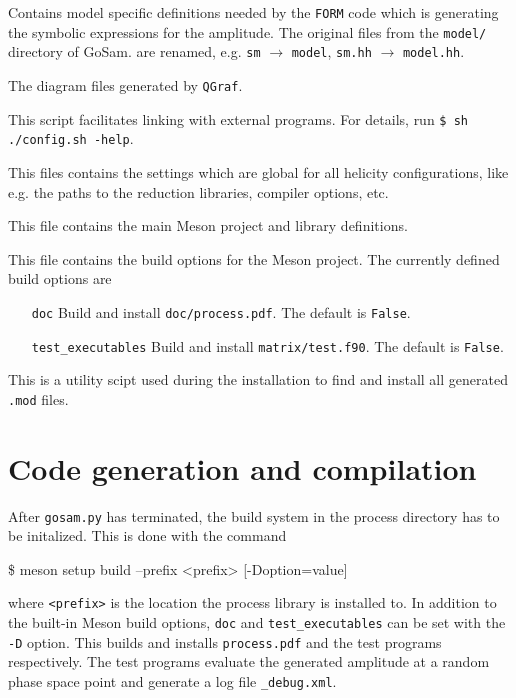 \documentclass[11pt,a4paper]{refrep}
\newcommand{\gosamversion}{{3{.}0}}
\newcommand{\gosamv}[1][\gosamversion]{{\sc GoSam}\xspace}
\newcommand{\qgraf}{{\tt QGraf}\xspace}
\newcommand{\form}{{\tt FORM}\xspace}
\begin{document}
Contains model specific definitions needed by the \form code
which is generating the symbolic expressions for the amplitude.
The original files from the \texttt{model/} directory of \gosamv. 
are renamed, e.g.
\texttt{sm} $\to$ \texttt{model}, \texttt{sm.hh} $\to$ \texttt{model.hh}.

 The diagram files generated
by \qgraf.

 This script facilitates linking with external
programs. For details, run
{\tt \$ sh ./config.sh -help}.

 This files contains the settings
which are global for all helicity configurations, 
like e.g. the paths to the reduction libraries, compiler options, etc.

 This file contains the main Meson project and library definitions.

 This file contains the build options for the Meson project. The currently
defined build options are 
\begin{itemize}
   \item[{\tt doc}] Build and install {\tt doc/process.pdf}. The default is {\tt False}.
   \item[{\tt test\_executables}] Build and install {\tt matrix/test.f90}. The default is {\tt False}. 
\end{itemize}

 This is a utility scipt used during the installation to find and
install all generated {\tt {.}mod} files.

\section{Code generation and compilation}
After {\tt gosam{.}py} has terminated, the build system in the process directory has to be initalized. 
This is done with the command 
\begin{example}
\$ meson setup build --prefix <prefix> [-Doption=value]
\end{example}
where {\tt <prefix>} is the location the process library is installed to. In addition to the built-in Meson
build options, {\tt doc} and {\tt test\_executables} can be set with the {\tt -D} option. This builds and 
installs {\tt process{.}pdf} and the test programs respectively. The test programs evaluate the generated
amplitude at a random phase space point and generate a log file {\tt \_debug.xml}.
\end{document}

